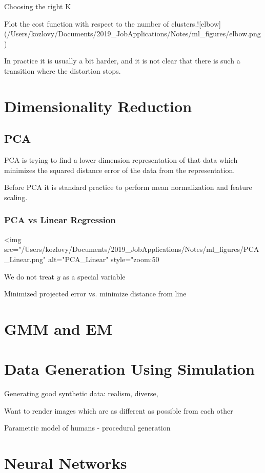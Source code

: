 {{Choosing the right K 

Plot the cost function with respect to the number of clusters.![elbow](/Users/kozlovy/Documents/2019_JobApplications/Notes/ml_figures/elbow.png)

In practice it is usually a bit harder, and it is not clear that there is such a transition where the distortion stops.

\section{Dimensionality Reduction}

\subsection{PCA}

PCA is trying to find a lower dimension representation of that data which minimizes the squared distance error of the data from the representation.

Before PCA it is standard practice to perform mean normalization and feature scaling. 

\subsubsection{PCA vs Linear Regression}

<img src="/Users/kozlovy/Documents/2019_JobApplications/Notes/ml_figures/PCA_Linear.png" alt="PCA_Linear" style="zoom:50%

We do not treat $y$ as a special variable

Minimized projected error vs. minimize distance from line

\section{GMM and EM}


\section{Data Generation Using Simulation}

Generating good synthetic data: 
realism, 
diverse,


Want to render images which are as different as possible from each other

Parametric model of humans - procedural generation

\section{Neural Networks}

}}
